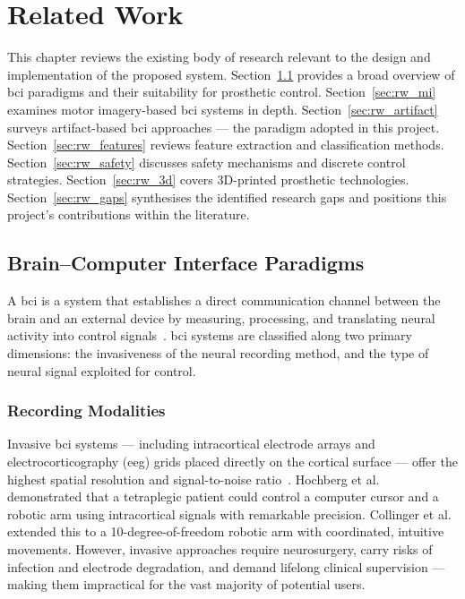 \chapter{Related Work}
\label{ch:related_work}

This chapter reviews the existing body of research relevant to the
design and implementation of the proposed system. Section~\ref{sec:rw_bci_overview}
provides a broad overview of \acrshort{bci} paradigms and their
suitability for prosthetic control. Section~\ref{sec:rw_mi} examines
motor imagery-based \acrshort{bci} systems in depth.
Section~\ref{sec:rw_artifact} surveys artifact-based \acrshort{bci}
approaches — the paradigm adopted in this project.
Section~\ref{sec:rw_features} reviews feature extraction and
classification methods. Section~\ref{sec:rw_safety} discusses
safety mechanisms and discrete control strategies.
Section~\ref{sec:rw_3d} covers 3D-printed prosthetic technologies.
Section~\ref{sec:rw_gaps} synthesises the identified research gaps
and positions this project's contributions within the literature.

\section{Brain--Computer Interface Paradigms}
\label{sec:rw_bci_overview}

A \acrfull{bci} is a system that establishes a direct communication
channel between the brain and an external device by measuring,
processing, and translating neural activity into control
signals~\cite{wolpaw2002bci}. \acrshort{bci} systems are classified
along two primary dimensions: the invasiveness of the neural
recording method, and the type of neural signal exploited for
control.

\subsection{Recording Modalities}

Invasive \acrshort{bci} systems — including intracortical electrode
arrays and electrocorticography (\acrshort{eeg}) grids placed directly
on the cortical surface — offer the highest spatial resolution and
signal-to-noise ratio~\cite{hochberg2006neuronal, collinger2013high}.
Hochberg et al.~\cite{hochberg2006neuronal} demonstrated that a
tetraplegic patient could control a computer cursor and a robotic arm
using intracortical signals with remarkable precision. Collinger
et al.~\cite{collinger2013high} extended this to a 10-degree-of-freedom
robotic arm with coordinated, intuitive movements. However, invasive
approaches require neurosurgery, carry risks of infection and
electrode degradation, and demand lifelong clinical supervision —
making them impractical for the vast majority of potential users.

